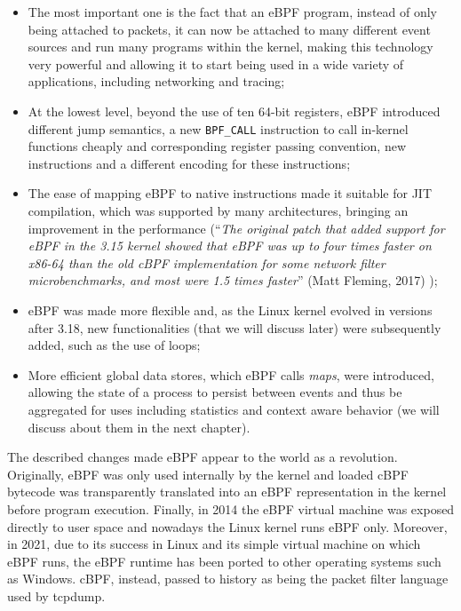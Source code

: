 \begin{itemize}
	\item 
		The most important one is the fact that an eBPF program, instead of only being attached to packets, it can now be attached to many different event sources and run many programs within the kernel, making this technology very powerful and allowing it to start being used in a wide variety of applications, including networking and tracing;
	\item 
		At the lowest level, beyond the use of ten 64-bit registers, eBPF introduced different jump semantics, a new \colorbox{backcolour}{\lstinline[style=commandline, language=bash, breaklines=true]|BPF_CALL|} instruction to call in-kernel functions cheaply and corresponding register passing convention, new instructions and a different encoding for these instructions;
	\item 
		The ease of mapping eBPF to native instructions made it suitable for JIT compilation, which was supported by many architectures, bringing an improvement in the performance (``\textit{The original patch that added support for eBPF in the 3.15 kernel showed that eBPF was up to four times faster on x86-64 than the old cBPF implementation for some network filter microbenchmarks, and most were 1.5 times faster}'' (Matt Fleming, 2017) \cite{eBPFThroughIntroduction});
	\item 
		eBPF was made more flexible and, as the Linux kernel evolved in versions after 3.18, new functionalities (that we will discuss later) were subsequently added, such as the use of loops;
	\item 
		More efficient global data stores, which eBPF calls \textit{maps}, were introduced, allowing the state of a process to persist between events and thus be aggregated for uses including statistics and context aware behavior (we will discuss about them in the next chapter).
\end{itemize}

The described changes made eBPF appear to the world as a revolution.
Originally, eBPF was only used internally by the kernel and loaded cBPF bytecode was transparently translated into an eBPF representation in the kernel before program execution.
Finally, in 2014 the eBPF virtual machine was exposed directly to user space and nowadays the Linux kernel runs eBPF only.
Moreover, in 2021, due to its success in Linux and its simple virtual machine on which eBPF runs, the eBPF runtime has been ported to other operating systems such as Windows.
cBPF, instead, passed to history as being the packet filter language used by tcpdump.

